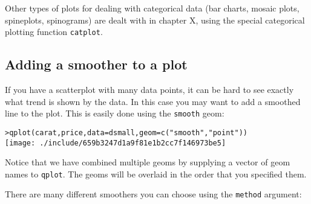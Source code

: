 Other types of plots for dealing with categorical data (bar charts, mosaic plots, spineplots, spinograms) are dealt with in chapter X, using the special categorical plotting function {\tt catplot}.

\subsection{Adding a smoother to a plot}\label{sub:smooth}

If you have a scatterplot with many data points, it can be hard to see exactly what trend is shown by the data.  In this case you may want to add a smoothed line to the plot.  This is easily done using the {\tt smooth} geom:

\begin{alltt}
> qplot(carat, price, data = dsmall, geom = c("smooth", "point"))
\texttt{[image: ./include/659b3247d1a9f81e1b2cc7f146973be5]}

\end{alltt}

Notice that we have combined multiple geoms by supplying a vector of geom names to {\tt qplot}.  The geoms will be overlaid in the order that you specified them.

There are many different smoothers you can choose using the {\tt method} argument:

